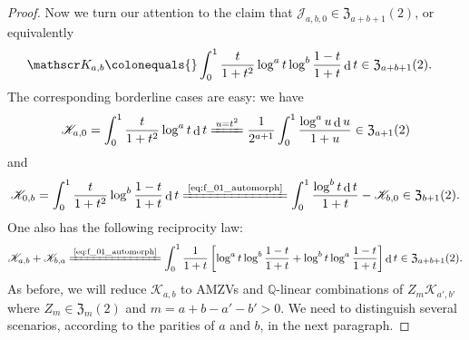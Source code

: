 \documentclass[final,notitlepage,12pt,reqno]{amsart}
\DeclareMathOperator{\D}{d}
\theoremstyle{plain}
\theoremstyle{definition}
\numberwithin{equation}{section}
\begin{document}
\begin{proof}
Now we turn our attention to the claim that $ \mathscr J_{a,b,0}\in\mathfrak Z_{a+b+1}(2)$, or equivalently\begin{align}
\mathscr K_{a,b}\colonequals{}&\int_{0}^{1}\frac{t}{1+t^{2}}\log ^{a}t\log^{b}\frac{1-t}{1+t}\D t\in\mathfrak Z_{a+b+1}(2).\label{eq:Kab_defn}
\end{align}
The corresponding borderline cases are easy: we have \begin{align}
\mathscr K_{a,0}=\int_{0}^{1}\frac{t}{1+t^{2}}\log ^{a}t\D t\xlongequal{u=t^2}\frac{1}{2^{a+1}}\int_0^1\frac{\log ^{a}u\D u}{1+u}\in\mathfrak Z_{a+1}(2)
\end{align}and \begin{align}
\mathscr K_{0,b}=\int_{0}^{1}\frac{t}{1+t^{2}}\log^{b}\frac{1-t}{1+t}\D t\xlongequal{\text{\eqref{eq:f_01_automorph}}}\int_{0}^1\frac{\log ^{b}t\D t}{1+t}-\mathscr K_{b,0}\in\mathfrak Z_{b+1}(2).
\end{align}One also has the following reciprocity law: \begin{align}
\mathscr K_{a,b}+\mathscr K_{b,a}\xlongequal{\text{\eqref{eq:f_01_automorph}}}\int_{0}^1\frac{1}{1+t}\left[\log ^{a}t\log^{b}\frac{1-t}{1+t}+\log ^{b}t\log^{a}\frac{1-t}{1+t}\right]\D t\in\mathfrak Z_{a+b+1}(2).\label{eq:Krecip}
\end{align}As before, we will reduce $ \mathscr K_{a,b}$ to AMZVs and $ \mathbb Q$-linear combinations of $ Z_m\mathscr K_{a',b'}$ where $ Z_m\in\mathfrak Z_m(2)$  and $ m=a+b-a'-b'>0$. We need to distinguish several scenarios, according to the parities of $a$ and $b$, in the next   paragraph.


\end{proof}
\end{document}
